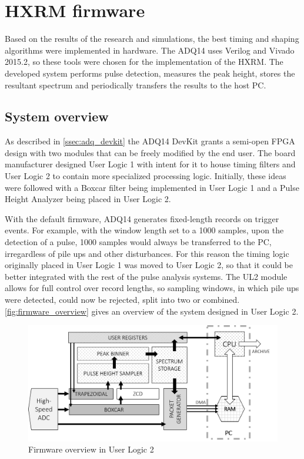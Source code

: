\section{HXRM firmware}

Based on the results of the research and simulations, the best timing
and shaping algorithms were implemented in hardware.
The ADQ14 uses Verilog and Vivado 2015.2, so these tools
were chosen for the implementation of the HXRM.
The developed system performs pulse detection,
measures the peak height, stores the resultant spectrum
and periodically transfers the results to the host PC.

\subsection{System overview}

As described in \autoref{ssec:adq_devkit} the ADQ14 DevKit
grants a semi-open FPGA design with two modules that can be
freely modified by the end user. The board manufacturer
designed User Logic 1 with intent for it to house timing filters
and User Logic 2 to contain more specialized processing logic.
Initially, these ideas were followed with a Boxcar filter being
implemented in User Logic 1 and a Pulse Height Analyzer being placed 
in User Logic 2.


With the default firmware, ADQ14 generates fixed-length records
on trigger events. For example, with the window length set to a 1000
samples, upon the detection of a pulse, 1000 samples would always be
transferred to the PC, irregardless of pile ups and other disturbances.
For this reason the timing logic originally placed in User Logic 1 was moved
to User Logic 2, so that it could be better integrated with the rest 
of the pulse analysis systems. The UL2 module allows for full control 
over record lengths, so sampling windows, in which pile ups were detected,
could now be rejected, split into two or combined.
\autoref{fig:firmware_overview} gives an overview of the system designed
in User Logic 2.

\begin{figure}[H]
  \centering
  \includegraphics[width=\linewidth]{media/fpga_system_trap.png}
  \caption{Firmware overview in User Logic 2}
  \label{fig:firmware_overview} 
\end{figure}
